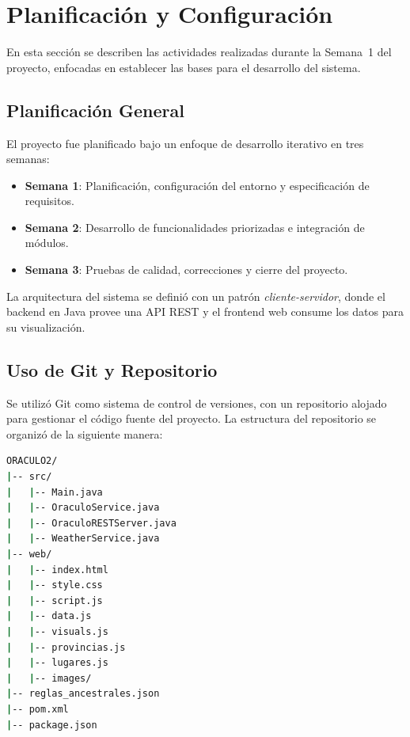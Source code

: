 \documentclass[conference]{IEEEtran}
\begin{document}
\section{Planificación y Configuración}

En esta sección se describen las actividades realizadas durante la Semana~1 del proyecto, enfocadas en establecer las bases para el desarrollo del sistema.

\subsection{Planificación General}

El proyecto fue planificado bajo un enfoque de desarrollo iterativo en tres semanas:

\begin{itemize}
    \item \textbf{Semana 1}: Planificación, configuración del entorno y especificación de requisitos.
    \item \textbf{Semana 2}: Desarrollo de funcionalidades priorizadas e integración de módulos.
    \item \textbf{Semana 3}: Pruebas de calidad, correcciones y cierre del proyecto.
\end{itemize}

La arquitectura del sistema se definió con un patrón \textit{cliente-servidor}, donde el backend en Java provee una API REST y el frontend web consume los datos para su visualización.

\subsection{Uso de Git y Repositorio}

Se utilizó Git como sistema de control de versiones, con un repositorio alojado para gestionar el código fuente del proyecto. La estructura del repositorio se organizó de la siguiente manera:

\begin{lstlisting}[caption={Estructura del repositorio}, language=bash, numbers=none]
ORACULO2/
|-- src/
|   |-- Main.java
|   |-- OraculoService.java
|   |-- OraculoRESTServer.java
|   |-- WeatherService.java
|-- web/
|   |-- index.html
|   |-- style.css
|   |-- script.js
|   |-- data.js
|   |-- visuals.js
|   |-- provincias.js
|   |-- lugares.js
|   |-- images/
|-- reglas_ancestrales.json
|-- pom.xml
|-- package.json
\end{lstlisting}
\end{document}
